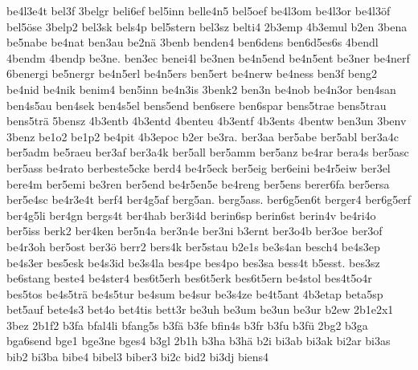 {    be4l3e4t
    bel3f
    3belgr
    beli6ef
    bel5inn
    belle4n5
    bel5oef
    be4l3om
    be4l3or
    be4l3öf
    bel5öse
    3belp2
    bel3sk
    bels4p
    bel5stern
    bel3sz
    belti4
    2b3emp
    4b3emul
    b2en
    3bena
    be5nabe
    be4nat
    ben3au
    be2nä
    3benb
    benden4
    ben6dens
    ben6d5es6s
    4bendl
    4bendm
    4bendp
    be3ne.
    ben3ec
    benei4l
    be3nen
    be4n5end
    be4n5ent
    be3ner
    be4nerf
    6benergi
    be5nergr
    be4n5erl
    be4n5ers
    ben5ert
    be4nerw
    be4ness
    ben3f
    beng2
    be4nid
    be4nik
    benim4
    ben5inn
    be4n3is
    3benk2
    ben3n
    be4nob
    be4n3or
    ben4san
    ben4s5au
    ben4sek
    ben4s5el
    bens5end
    ben6sere
    ben6spar
    bens5trae
    bens5trau
    bens5trä
    5bensz
    4b3entb
    4b3entd
    4benteu
    4b3entf
    4b3ents
    4bentw
    ben3un
    3benv
    3benz
    be1o2
    be1p2
    be4pit
    4b3epoc
    b2er
    be3ra.
    ber3aa
    ber5abe
    ber5abl
    ber3a4c
    ber5adm
    be5raeu
    ber3af
    ber3a4k
    ber5all
    ber5amm
    ber5anz
    be4rar
    bera4s
    ber5asc
    ber5ass
    be4rato
    berbeste5cke
    berd4
    be4r5eck
    ber5eig
    ber6eini
    be4r5eiw
    ber3el
    bere4m
    ber5emi
    be3ren
    ber5end
    be4r5en5e
    be4reng
    ber5ens
    berer6fa
    ber5ersa
    ber5e4sc
    be4r3e4t
    berf4
    ber4g5af
    berg5an.
    berg5ass.
    ber6g5en6t
    berger4
    ber6g5erf
    ber4g5li
    ber4gn
    bergs4t
    ber4hab
    ber3i4d
    berin6sp
    berin6st
    berin4v
    be4ri4o
    ber5iss
    berk2
    ber4ken
    ber5n4a
    ber3n4e
    ber3ni
    b3ernt
    ber3o4b
    ber3oe
    ber3of
    be4r3oh
    ber5ost
    ber3ö
    berr2
    bers4k
    ber5stau
    b2e1s
    be3s4an
    besch4
    be4s3ep
    be4s3er
    bes5esk
    be4s3id
    be3s4la
    bes4pe
    bes4po
    bes3sa
    bess4t
    b5esst.
    bes3sz
    be6stang
    beste4
    be4ster4
    bes6t5erh
    bes6t5erk
    bes6t5ern
    be4stol
    bes4t5o4r
    bes5tos
    be4s5trä
    be4s5tur
    be4sum
    be4sur
    be3s4ze
    be4t5ant
    4b3etap
    beta5sp
    bet5auf
    bete4s3
    bet4o
    bet4tis
    bett3r
    be3uh
    be3um
    be3un
    be3ur
    b2ew
    2b1e2x1
    3bez
    2b1f2
    b3fa
    bfal4li
    bfang5s
    b3fä
    b3fe
    bfin4s
    b3fr
    b3fu
    b3fü
    2bg2
    b3ga
    bga6send
    bge1
    bge3ne
    bges4
    b3gl
    2b1h
    b3ha
    b3hä
    b2i
    bi3ab
    bi3ak
    bi2ar
    bi3as
    bib2
    bi3ba
    bibe4
    bibel3
    biber3
    bi2c
    bid2
    bi3dj
    biens4
}
